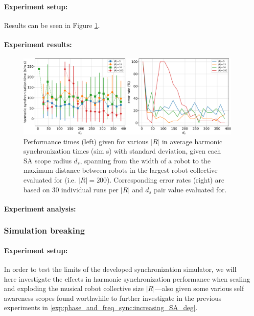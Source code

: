 				\paragraph{Experiment setup:\nl}
				
				Results can be seen in Figure \ref{fig:phase_and_freq_sync_d_s_SA_scope_tuning}.
				
				\paragraph{Experiment results:\nl}
				
				\begin{figure}[ht!]
					\centering
					\includegraphics[width=\linewidth]{Assets/DocSegments/Chapters/ExperimentsAndResults/Figures/PerfScores/phase_and_freq_sync_d_s_SA_scope_tuning_experiment_performance.pdf}
					\caption[Experiment results for $\phi$ \& $\omega$ synchronization $d_s$ SA scope tuning experiment.]{Performance times (left) given for various $|R|$ in average harmonic synchronization times (sim s) with standard deviation, given each SA scope radius $d_s$, spanning from the width of a robot to the maximum distance between robots in the largest robot collective evaluated for (i.e. $|R|=200$). Corresponding error rates (right) are based on 30 individual runs per $|R|$ and $d_s$ pair value evaluated for.}
					\label{fig:phase_and_freq_sync_d_s_SA_scope_tuning}
				\end{figure}
				
				\paragraph{Experiment analysis:\nl}
	
	
		\subsubsection{Simulation breaking}
		
			\paragraph{Experiment setup:\nl}
			
			In order to test the limits of the developed synchronization simulator, we will here investigate the effects in harmonic synchronization performance when scaling and exploding the musical robot collective size $|R|$—also given some various self awareness scopes found worthwhile to further investigate in the previous experiments in \ref{exp:phase_and_freq_sync:increasing_SA_deg}.
	
